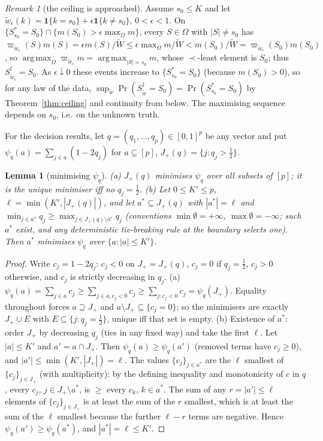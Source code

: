 \documentclass[11pt]{article}
\newtheorem{lemma}[theorem]{Lemma}
\theoremstyle{remark}
\newtheorem{remark}[theorem]{Remark}
\newcommand{\one}{\mathbf 1}
\DeclareMathOperator*{\argmax}{arg\,max}
\begin{document}
\begin{remark}[the ceiling is approached]\label{rem:sharp}
Assume $s_0\le K$ and let $\tilde w_\epsilon(k)=\one\{k=s_0\}+\epsilon\one\{k\ne s_0\}$, $0<\epsilon<1$. On $\{S^*_{s_0}=S_0\}\cap\{m(S_0)>\epsilon\max_\Omega m\}$, every $S\in\Omega$ with $|S|\ne s_0$ has $\varpi_{\tilde w_\epsilon}(S)m(S)=\epsilon m(S)/\tilde W\le\epsilon\max_\Omega m/\tilde W<m(S_0)/\tilde W=\varpi_{\tilde w_\epsilon}(S_0)m(S_0)$, so $\argmax_\Omega\varpi_{\tilde w_\epsilon}m=\argmax_{|S|=s_0}m$, whose $\prec$-least element is $S_0$; thus $S^\dagger_{\tilde w_\epsilon}=S_0$. As $\epsilon\downarrow0$ these events increase to $\{S^*_{s_0}=S_0\}$ (because $m(S_0)>0$), so for any law of the data, $\sup_{\tilde w}\Pr(S^\dagger_{\tilde w}=S_0)=\Pr(S^*_{s_0}=S_0)$ by Theorem~\ref{thm:ceiling} and continuity from below. The maximising sequence depends on $s_0$, i.e.\ on the unknown truth.
\end{remark}

For the decision results, let $q=(q_1,\dots,q_p)\in[0,1]^p$ be any vector and put $\psi_q(a)=\sum_{j\in a}(1-2q_j)$ for $a\subseteq[p]$, $J_+(q)=\{j:q_j>\tfrac12\}$.

\begin{lemma}[minimising $\psi_q$]\label{lem:psi}
(a) $J_+(q)$ minimises $\psi_q$ over all subsets of $[p]$; it is the unique minimiser iff no $q_j=\tfrac12$.
(b) Let $0\le K'\le p$, $\ell=\min(K',|J_+(q)|)$, and let $a^*\subseteq J_+(q)$ with $|a^*|=\ell$ and $\min_{j\in a^*}q_j\ge\max_{j\in J_+(q)\setminus a^*}q_j$ (conventions $\min\emptyset=+\infty$, $\max\emptyset=-\infty$; such $a^*$ exist, and any deterministic tie-breaking rule at the boundary selects one). Then $a^*$ minimises $\psi_q$ over $\{a:|a|\le K'\}$.
\end{lemma}
\begin{proof}
Write $c_j=1-2q_j$: $c_j<0$ on $J_+=J_+(q)$, $c_j=0$ if $q_j=\frac12$, $c_j>0$ otherwise, and $c_j$ is strictly decreasing in $q_j$.
(a) $\psi_q(a)=\sum_{j\in a}c_j\ge\sum_{j\in a,c_j<0}c_j\ge\sum_{j:c_j<0}c_j=\psi_q(J_+)$. Equality throughout forces $a\supseteq J_+$ and $a\setminus J_+\subseteq\{c_j=0\}$; so the minimisers are exactly $J_+\cup E$ with $E\subseteq\{j:q_j=\tfrac12\}$, unique iff that set is empty.
(b) Existence of $a^*$: order $J_+$ by decreasing $q_j$ (ties in any fixed way) and take the first $\ell$. Let $|a|\le K'$ and $a'=a\cap J_+$. Then $\psi_q(a)\ge\psi_q(a')$ (removed terms have $c_j\ge0$), and $|a'|\le\min(K',|J_+|)=\ell$. The values $\{c_j\}_{j\in a^*}$ are the $\ell$ smallest of $\{c_j\}_{j\in J_+}$ (with multiplicity): by the defining inequality and monotonicity of $c$ in $q$, every $c_j$, $j\in J_+\setminus a^*$, is $\ge$ every $c_k$, $k\in a^*$. The sum of any $r=|a'|\le\ell$ elements of $\{c_j\}_{j\in J_+}$ is at least the sum of the $r$ smallest, which is at least the sum of the $\ell$ smallest because the further $\ell-r$ terms are negative. Hence $\psi_q(a')\ge\psi_q(a^*)$, and $|a^*|=\ell\le K'$.
\end{proof}
\end{document}
